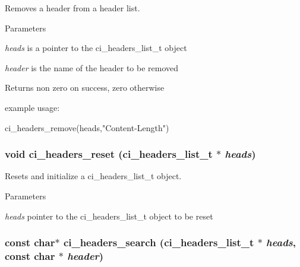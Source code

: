 Removes a header from a header list. 
\begin{DoxyParams}{Parameters}
\item[{\em heads}]is a pointer to the ci\_\-headers\_\-list\_\-t object \item[{\em header}]is the name of the header to be removed \end{DoxyParams}
\begin{DoxyReturn}{Returns}
non zero on success, zero otherwise
\end{DoxyReturn}
example usage: 
\begin{DoxyCode}
  ci_headers_remove(heads,"Content-Length")
\end{DoxyCode}
 \hypertarget{group__HEADERS_gac72053f066dd9ae607bc41b80a37d708}{
\subsubsection[{ci\_\-headers\_\-reset}]{\setlength{\rightskip}{0pt plus 5cm}void ci\_\-headers\_\-reset ({\bf ci\_\-headers\_\-list\_\-t} $\ast$ {\em heads})}}
\label{group__HEADERS_gac72053f066dd9ae607bc41b80a37d708}


Resets and initialize a ci\_\-headers\_\-list\_\-t object. 
\begin{DoxyParams}{Parameters}
\item[{\em heads}]pointer to the ci\_\-headers\_\-list\_\-t object to be reset \end{DoxyParams}
\hypertarget{group__HEADERS_ga6926728df76776452cfd5b887fbc6ea3}{
\subsubsection[{ci\_\-headers\_\-search}]{\setlength{\rightskip}{0pt plus 5cm}const char$\ast$ ci\_\-headers\_\-search ({\bf ci\_\-headers\_\-list\_\-t} $\ast$ {\em heads}, \/  const char $\ast$ {\em header})}}
\label{group__HEADERS_ga6926728df76776452cfd5b887fbc6ea3}


